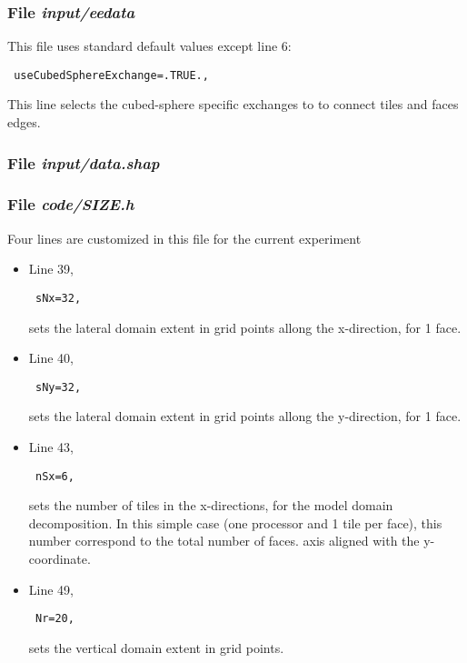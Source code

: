 \begin{small}

\end{small}

\subsubsection{File {\it input/eedata}}
\label{www:tutorials}

This file uses standard default values except line 6:
\begin{verbatim}
 useCubedSphereExchange=.TRUE.,
\end{verbatim}
This line selects the cubed-sphere specific exchanges to
to connect tiles and faces edges.

\subsubsection{File {\it input/data.shap}}
\label{www:tutorials}



\begin{small}

\end{small}

\subsubsection{File {\it code/SIZE.h}}
\label{www:tutorials}

Four lines are customized in this file for the current experiment

\begin{itemize}

\item Line 39, 
\begin{verbatim} sNx=32, \end{verbatim}
sets the lateral domain extent in grid points allong the x-direction,
for 1 face.

\item Line 40,
\begin{verbatim} sNy=32, \end{verbatim} 
sets the lateral domain extent in grid points allong the y-direction,
for 1 face.

\item Line 43,
\begin{verbatim} nSx=6, \end{verbatim} 
sets the number of tiles in the x-directions, for the model domain
decomposition. In this simple case (one processor and 1 tile per 
face), this number correspond to the total number of faces.
axis aligned with the y-coordinate.

\item Line 49, 
\begin{verbatim} Nr=20,   \end{verbatim} 
sets the vertical domain extent in grid points.

\end{itemize}

